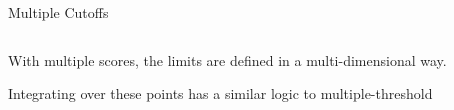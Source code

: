 \documentclass[notes,11pt, aspectratio=169]{beamer}
\newenvironment{wideitemize}{\itemize\addtolength{\itemsep}{10pt}}{\enditemize}
\begin{document}
\begin{frame}{Multiple Cutoffs}
  \begin{columns}[onlytextwidth, T] %
    \begin{column}{.6\textwidth}
      \begin{wideitemize}
      \item With multiple scores, the limits are defined in a multi-dimensional way.
      \item Integrating over these points has a similar logic to multiple-threshold
      \end{wideitemize}
    \end{column}
    \begin{column}{.4\textwidth}
    \end{column}%
  \end{columns}
\end{frame}
\end{document}
